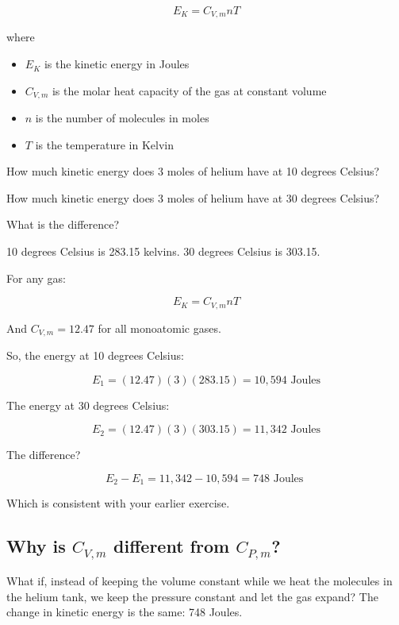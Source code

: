 $$E_K = C_{V,m} n T$$

where

\begin{itemize}
\item $E_K$ is the kinetic energy in Joules
\item $C_{V,m}$ is the molar heat capacity of the gas at constant volume
\item $n$ is the number of molecules in moles
\item $T$ is the temperature in Kelvin
\end{itemize}


\begin{Exercise}[title={Warming Helium Revisited}, label=warming_helium2]

How much kinetic energy does 3 moles of helium have at 10 degrees Celsius?

How much kinetic energy does 3 moles of helium have at 30 degrees Celsius?

What is the difference?

\end{Exercise}
\begin{Answer}[ref=warming_helium2]

10 degrees Celsius is 283.15 kelvins. 30 degrees Celsius is 303.15.

For any gas:

$$E_K =C_{V,m} n T$$

And $C_{V,m} = 12.47$ for all monoatomic gases.

So, the energy at 10 degrees Celsius:

$$E_1 = (12.47)(3)(283.15) = 10,594 \text{ Joules}$$

The energy at 30 degrees Celsius:

$$E_2 = (12. 47)(3)(303.15) = 11,342 \text{ Joules}$$

The difference?

$$E_2 - E_1 = 11,342 - 10,594  = 748 \text{ Joules }$$

Which is consistent with your earlier exercise.

\end{Answer}

\subsection{Why is $C_{V,m}$ different from $C_{P,m}$?}

What if, instead of keeping the volume constant while we heat the molecules in the helium tank, we keep the pressure constant and let the gas expand? 
The change in kinetic energy is the same: 748 Joules.

